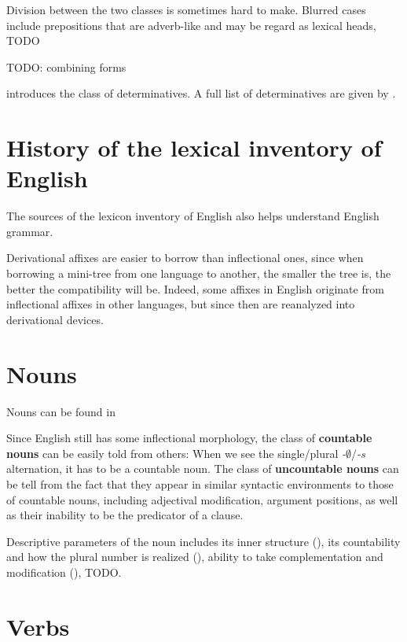 \documentclass[UTF8, a4paper, oneside, scheme=plain, 12pt]{ctexbook}
\newcommand*{\citepage}[1]{p.~{#1}}
\newcommand*{\concept}[1]{\textbf{#1}}
\newcommand{\form}[1]{\emph{#1}}
\newcommand{\emptymorpheme}{$\emptyset$}
\begin{document}
Division between the two classes 
is sometimes hard to make.
Blurred cases include 
prepositions that are adverb-like and may be regard as lexical heads, TODO

TODO: combining forms \citep[\citepage{1661}]{cgel}


\citet[\citepage{330}]{cgel} introduces the class of determinatives.
A full list of determinatives are given by \citet[\citepage{356}]{cgel}.

\section{History of the lexical inventory of English}\label{sec:pos.inventory}

The sources of the lexicon inventory of English 
also helps understand English grammar.


Derivational affixes are easier to borrow than inflectional ones, 
since when borrowing a mini-tree from one language to another, 
the smaller the tree is, 
the better the compatibility will be. 
Indeed, some affixes in English originate from inflectional affixes in other languages, 
but since then are reanalyzed into derivational devices.

\section{Nouns}\label{sec:pos.noun}

Nouns can be found in 

Since English still has some inflectional morphology,
the class of \concept{countable nouns} can be easily told from others:
When we see the single/plural \form{-\emptymorpheme}/\form{-s} alternation, 
it has to be a countable noun.
The class of \concept{uncountable nouns} can be tell from 
the fact that they appear in similar syntactic environments 
to those of countable nouns,
including adjectival modification,
argument positions,
as well as their inability to be the predicator of a clause.

Descriptive parameters of the noun includes 
its inner structure (), 
its countability and how the plural number is realized (),
ability to take complementation and modification (), TODO.



\section{Verbs}\label{sec:pos.verb}
\end{document}
